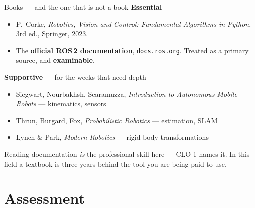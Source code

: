 \documentclass[aspectratio=169]{beamer}
\begin{document}
\begin{frame}{Books --- and the one that is not a book}
  \small
  \textbf{Essential}
  \begin{itemize}\footnotesize
    \item P.\ Corke, \emph{Robotics, Vision and Control: Fundamental Algorithms in Python},
          3rd ed., Springer, 2023.
    \item The \textbf{official ROS\,2 documentation}, \texttt{docs.ros.org}. Treated as a
          primary source, and \textbf{examinable}.
  \end{itemize}

  \vspace{0.5em}
  \textbf{Supportive} --- for the weeks that need depth
  \begin{itemize}\footnotesize
    \item Siegwart, Nourbakhsh, Scaramuzza, \emph{Introduction to Autonomous Mobile Robots} --- kinematics, sensors
    \item Thrun, Burgard, Fox, \emph{Probabilistic Robotics} --- estimation, SLAM
    \item Lynch \& Park, \emph{Modern Robotics} --- rigid-body transformations
  \end{itemize}

  \vspace{0.5em}
  \begin{inthefield}
    \footnotesize
    Reading documentation \emph{is} the professional skill here --- CLO 1 names it. In this
    field a textbook is three years behind the tool you are being paid to use.
  \end{inthefield}
\end{frame}

\section{Assessment}
\end{document}
